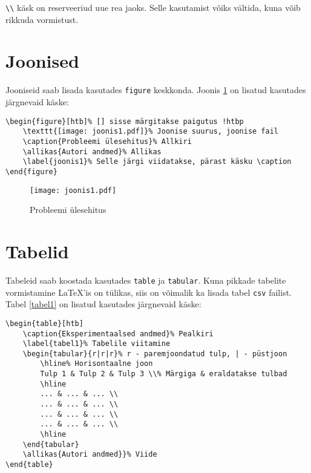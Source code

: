 \documentclass{trkut}%
\begin{document}
\verb!\\! käsk on reserveeriud uue rea jaoks. Selle kasutamist võiks vältida, kuna võib rikkuda vormistust.

\section{Joonised}\label{sec:1}
Jooniseid saab lisada kasutades \verb!figure! keskkonda. Joonis \ref{joonis1} on lisatud kasutades järgnevaid käske:
\begin{verbatim}
\begin{figure}[htb]% [] sisse märgitakse paigutus !htbp
    \texttt{[image: joonis1.pdf]}% Joonise suurus, joonise fail
    \caption{Probleemi ülesehitus}% Allkiri
    \allikas{Autori andmed}% Allikas
    \label{joonis1}% Selle järgi viidatakse, pärast käsku \caption
\end{figure}
\end{verbatim}
\begin{figure}[htb]%
    \texttt{[image: joonis1.pdf]}%
    \caption{Probleemi ülesehitus}%
    \label{joonis1}%
\end{figure}

\section{Tabelid}
Tabeleid saab koostada kasutades \verb!table! ja \verb!tabular!. Kuna pikkade tabelite vormistamine \LaTeX'is on tülikas, siis on võimalik ka lisada tabel \verb!csv! failist. Tabel \ref{tabel1} on lisatud kasutades järgnevaid käske:
\begin{verbatim}
\begin{table}[htb]
    \caption{Eksperimentaalsed andmed}% Pealkiri
    \label{tabel1}% Tabelile viitamine
    \begin{tabular}{r|r|r}% r - paremjoondatud tulp, | - püstjoon
        \hline% Horisontaalne joon
        Tulp 1 & Tulp 2 & Tulp 3 \\% Märgiga & eraldatakse tulbad
        \hline
        ... & ... & ... \\
        ... & ... & ... \\
        ... & ... & ... \\
        ... & ... & ... \\
        \hline
    \end{tabular}
    \allikas{Autori andmed}}% Viide
\end{table}
\end{verbatim}
\end{document}

